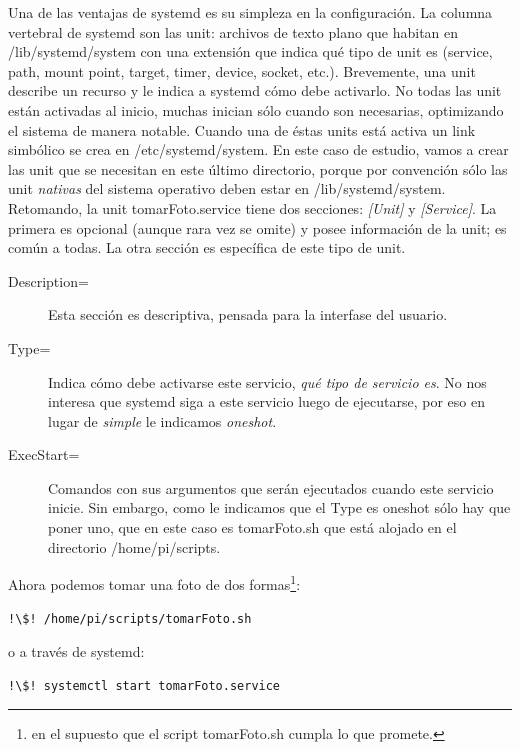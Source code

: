 \documentclass[10pt,a4paper]{article}
\begin{document}
Una de las ventajas de systemd es su simpleza en la configuraci\'on. La columna vertebral de systemd son las unit: archivos de texto plano que habitan en /lib/systemd/system con una extensi\'on que indica qu\'e tipo de unit es (service, path, mount point, target, timer, device, socket, etc.). Brevemente, una unit describe un recurso y le indica a systemd c\'omo debe activarlo. No todas las unit est\'an activadas al inicio, muchas inician s\'olo cuando son necesarias, optimizando el sistema de manera notable. Cuando una de \'estas units est\'a activa un link simb\'olico se crea en /etc/systemd/system. En este caso de estudio, vamos a crear las unit que se necesitan en este \'ultimo directorio, porque por convenci\'on s\'olo las unit \emph{nativas} del sistema operativo deben estar en /lib/systemd/system.\\

Retomando, la unit tomarFoto.service tiene dos secciones: \emph{[Unit]} y \emph{[Service]}. La primera es opcional (aunque rara vez se omite) y posee informaci\'on de la unit; es com\'un a todas. La otra secci\'on es espec\'ifica de este tipo de unit. 

\begin{description}
    \item [Description=] Esta secci\'on es descriptiva, pensada para la interfase del usuario.
    \item [Type=] Indica c\'omo debe activarse este servicio, \emph{qu\'e tipo de servicio es}. No nos interesa que systemd siga a este servicio luego de ejecutarse, por eso en lugar de \emph{simple} le indicamos \emph{oneshot}.
    \item [ExecStart=] Comandos con sus argumentos que ser\'an ejecutados cuando este servicio inicie. Sin embargo, como le indicamos que el Type es oneshot s\'olo hay que poner uno, que en este caso es tomarFoto.sh que est\'a alojado en el directorio /home/pi/scripts.
\end{description}

Ahora podemos tomar una foto de dos formas\footnote{en el supuesto que el script tomarFoto.sh cumpla lo que promete.}:

\begin{lstlisting}
!\$! /home/pi/scripts/tomarFoto.sh
\end{lstlisting}

o a trav\'es de systemd:

\begin{lstlisting}
!\$! systemctl start tomarFoto.service
\end{lstlisting}
\end{document}
